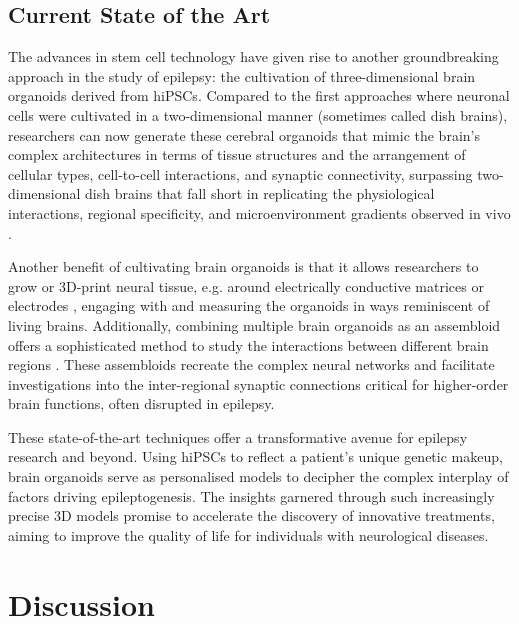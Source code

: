\documentclass[10pt]{article}
\begin{document}
\begin{sloppypar}
  \subsection{Current State of the Art}
  \label{sec:current-state-of-the-art}

  The advances in stem cell technology have given rise to another groundbreaking approach in the study of epilepsy: the cultivation of three-dimensional brain organoids derived from hiPSCs. Compared to the first approaches where neuronal cells were cultivated in a two-dimensional manner (sometimes called dish brains), researchers can now generate these cerebral organoids that mimic the brain’s complex architectures in terms of tissue structures and the arrangement of cellular types, cell-to-cell interactions, and synaptic connectivity, surpassing two-dimensional dish brains that fall short in replicating the physiological interactions, regional specificity, and microenvironment gradients observed in vivo \citep{clevers_modeling_2016, wang_modeling_2018}.

  Another benefit of cultivating brain organoids is that it allows researchers to grow or 3D-print neural tissue, e.g. around electrically conductive matrices or electrodes \citep{yao_3d_2023}, engaging with and measuring the organoids in ways reminiscent of living brains. Additionally, combining multiple brain organoids as an assembloid offers a sophisticated method to study the interactions between different brain regions \citep{sloan_generation_2018}. These assembloids recreate the complex neural networks and facilitate investigations into the inter-regional synaptic connections critical for higher-order brain functions, often disrupted in epilepsy.

  These state-of-the-art techniques offer a transformative avenue for epilepsy research and beyond. Using hiPSCs to reflect a patient’s unique genetic makeup, brain organoids serve as personalised models to decipher the complex interplay of factors driving epileptogenesis. The insights garnered through such increasingly precise 3D models promise to accelerate the discovery of innovative treatments, aiming to improve the quality of life for individuals with neurological diseases.

  \section{Discussion}
  \label{sec:discussion}



\end{sloppypar}
\end{document}
